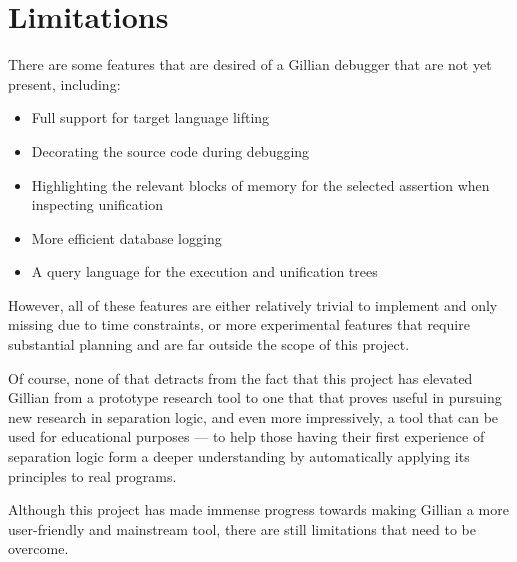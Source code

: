 
\section{Limitations}%
\label{sec:eval:limitations}

There are some features that are desired of a Gillian debugger that are not yet
present, including:
\begin{itemize}
  \item Full support for target language lifting
  \item Decorating the source code during debugging
  \item Highlighting the relevant blocks of memory for the selected assertion
        when inspecting unification
  \item More efficient database logging
  \item A query language for the execution and unification trees
\end{itemize}


However, all of these features are either relatively trivial to implement and
only missing due to time constraints, or more experimental features that require
substantial planning and are far outside the scope of this project.

Of course, none of that detracts from the fact that this project has elevated
Gillian from a prototype research tool to one that that proves useful in
pursuing new research in separation logic, and even more impressively, a tool
that can be used for educational purposes --- to help those having their first
experience of separation logic form a deeper understanding by automatically
applying its principles to real programs.


Although this project has made immense progress towards making Gillian a more
user-friendly and mainstream tool, there are still limitations that need to be
overcome.

